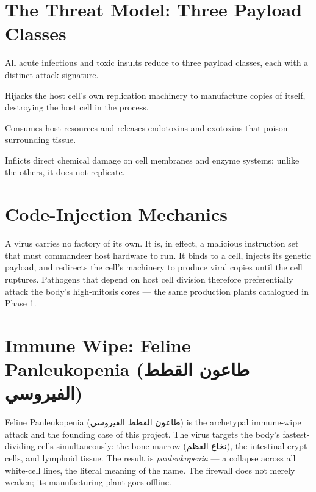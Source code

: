 \documentclass[12pt,oneside]{book}
\newcommand{\ar}[1]{\textarabic{#1}}
\begin{document}
\section{The Threat Model: Three Payload Classes}
All acute infectious and toxic insults reduce to three payload classes,
each with a distinct attack signature.
\begin{description}[leftmargin=2em,style=nextline]
  \item[Viral payload (code injection) --- \ar{العدوى الفيروسية}]
        Hijacks the host cell's own replication machinery to manufacture
        copies of itself, destroying the host cell in the process.
  \item[Bacterial payload (resource hijack) --- \ar{العدوى البكتيرية}]
        Consumes host resources and releases endotoxins and exotoxins
        that poison surrounding tissue.
  \item[Toxic payload (corrosive input) --- \ar{السموم}]
        Inflicts direct chemical damage on cell membranes and enzyme
        systems; unlike the others, it does not replicate.
\end{description}

\section{Code-Injection Mechanics}
A virus carries no factory of its own. It is, in effect, a malicious
instruction set that must commandeer host hardware to run. It binds to a
cell, injects its genetic payload, and redirects the cell's machinery to
produce viral copies until the cell ruptures. Pathogens that depend on
host cell division therefore preferentially attack the body's
high-mitosis cores --- the same production plants catalogued in Phase 1.

\section{Immune Wipe: Feline Panleukopenia \texorpdfstring{(\ar{طاعون القطط الفيروسي})}{}}
Feline Panleukopenia (\ar{طاعون القطط الفيروسي}) is the archetypal
immune-wipe attack and the founding case of this project. The virus
targets the body's fastest-dividing cells simultaneously: the bone marrow
(\ar{نخاع العظم}), the intestinal crypt cells, and lymphoid tissue. The
result is \emph{panleukopenia} --- a collapse across all white-cell lines,
the literal meaning of the name. The firewall does not merely weaken; its
manufacturing plant goes offline.
\end{document}
